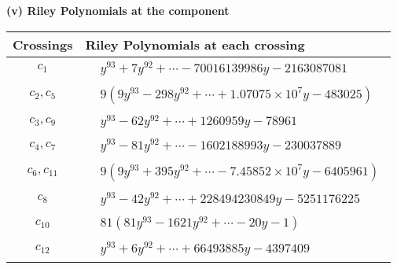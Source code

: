 \documentclass[1p]{elsarticle_modified}
\theoremstyle{definition}
\begin{document}
\newpage\renewcommand{\arraystretch}{1}
\flushleft \textbf{(v) Riley Polynomials at the component}\newline \\
\begin{tabular}{m{50pt}|m{274pt}}
Crossings & \hspace{64pt}Riley Polynomials at each crossing \\
\hline $$\begin{aligned}c_{1}\end{aligned}$$&$\begin{aligned}
&y^{93}+7 y^{92}+\cdots-70016139986 y-2163087081
\end{aligned}$\\
\hline $$\begin{aligned}c_{2},c_{5}\end{aligned}$$&$\begin{aligned}
&9(9 y^{93}-298 y^{92}+\cdots+1.07075\times10^{7} y-483025)
\end{aligned}$\\
\hline $$\begin{aligned}c_{3},c_{9}\end{aligned}$$&$\begin{aligned}
&y^{93}-62 y^{92}+\cdots+1260959 y-78961
\end{aligned}$\\
\hline $$\begin{aligned}c_{4},c_{7}\end{aligned}$$&$\begin{aligned}
&y^{93}-81 y^{92}+\cdots-1602188993 y-230037889
\end{aligned}$\\
\hline $$\begin{aligned}c_{6},c_{11}\end{aligned}$$&$\begin{aligned}
&9(9 y^{93}+395 y^{92}+\cdots-7.45852\times10^{7} y-6405961)
\end{aligned}$\\
\hline $$\begin{aligned}c_{8}\end{aligned}$$&$\begin{aligned}
&y^{93}-42 y^{92}+\cdots+228494230849 y-5251176225
\end{aligned}$\\
\hline $$\begin{aligned}c_{10}\end{aligned}$$&$\begin{aligned}
&81(81 y^{93}-1621 y^{92}+\cdots-20 y-1)
\end{aligned}$\\
\hline $$\begin{aligned}c_{12}\end{aligned}$$&$\begin{aligned}
&y^{93}+6 y^{92}+\cdots+66493885 y-4397409
\end{aligned}$\\
\hline
\end{tabular}\\~\\
\end{document}
